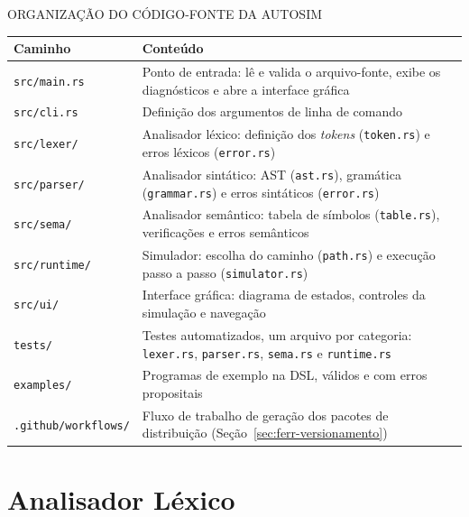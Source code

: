 \documentclass[
    12pt
    ,oneside
    ,a4paper
    ,chapter=TITLE
    ,section=TITLE
    ,sumario=abnt-6027-2012]{abntex2}
\begin{document}
\begin{quadro}[h]
    \centering
    \caption{ORGANIZAÇÃO DO CÓDIGO-FONTE DA AUTOSIM}
    \label{quad:organizacao-codigo}
    \small
    \begin{tabularx}{\textwidth}{|l|Z|}
        \hline
        \textbf{Caminho} & \textbf{Conteúdo} \\
        \hline
        \texttt{src/main.rs}   & Ponto de entrada: lê e valida o arquivo-fonte, exibe os diagnósticos e abre a interface gráfica \\
        \hline
        \texttt{src/cli.rs}    & Definição dos argumentos de linha de comando \\
        \hline
        \texttt{src/lexer/}    & Analisador léxico: definição dos \textit{tokens} (\texttt{token.rs}) e erros léxicos (\texttt{error.rs}) \\
        \hline
        \texttt{src/parser/}   & Analisador sintático: AST (\texttt{ast.rs}), gramática (\texttt{grammar.rs}) e erros sintáticos (\texttt{error.rs}) \\
        \hline
        \texttt{src/sema/}     & Analisador semântico: tabela de símbolos (\texttt{table.rs}), verificações e erros semânticos \\
        \hline
        \texttt{src/runtime/}  & Simulador: escolha do caminho (\texttt{path.rs}) e execução passo a passo (\texttt{simulator.rs}) \\
        \hline
        \texttt{src/ui/}       & Interface gráfica: diagrama de estados, controles da simulação e navegação \\
        \hline
        \texttt{tests/}        & Testes automatizados, um arquivo por categoria: \texttt{lexer.rs}, \texttt{parser.rs}, \texttt{sema.rs} e \texttt{runtime.rs} \\
        \hline
        \texttt{examples/}     & Programas de exemplo na DSL, válidos e com erros propositais \\
        \hline
        \texttt{.github/workflows/} & Fluxo de trabalho de geração dos pacotes de distribuição (Seção~\ref{sec:ferr-versionamento}) \\
        \hline
    \end{tabularx}
\end{quadro}

\section{Analisador Léxico}
\label{sec:impl-lexer}
\end{document}
